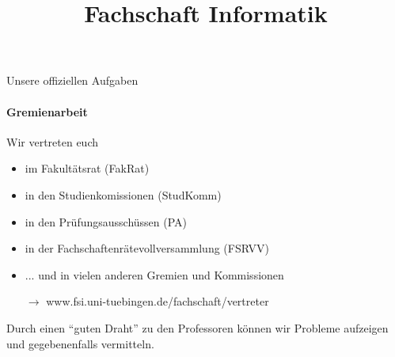 \documentclass{beamer}
\title{Fachschaft Informatik}
\begin{document}
	\maketitle


	\begin{frame}{Unsere offiziellen Aufgaben}
		\framesubtitle{Gremienarbeit}
		Wir vertreten euch
		\begin{itemize}
			\item im Fakultätsrat (FakRat)
			\item in den Studienkomissionen (StudKomm)
			\item in den Prüfungsausschüssen (PA)
			\item in der Fachschaftenrätevollversammlung (FSRVV)
			\item ... und in vielen anderen Gremien und Kommissionen
			\item[$\rightarrow$] www.fsi.uni-tuebingen.de/fachschaft/vertreter
		\end{itemize}
		Durch einen ``guten Draht'' zu den Professoren können wir Probleme aufzeigen und gegebenenfalls vermitteln.
	\end{frame}


\end{document}
